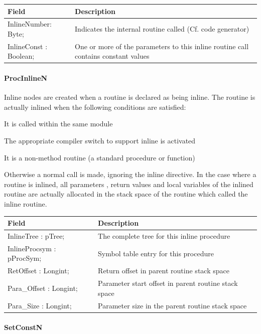 \documentclass [a4paper,12pt]{article}
\begin{document}
\begin{longtable}{|l|p{10cm}|}
\hline
Field   & Description \\
\hline
\endhead
\hline
\endfoot
\textsf{InlineNumber: Byte;}    &  Indicates the internal routine called (Cf. code generator) \\
\textsf{InlineConst : Boolean;} &
    One or more of the parameters to this inline routine call contains
    constant values
\label{tab25}
\end{longtable}

\paragraph{ProcInlineN}\mbox{}

Inline nodes are created when a routine is declared as being inline. The
routine is actually inlined when the following conditions are satisfied:

It is called within the same module

The appropriate compiler switch to support inline is activated

It is a non-method routine (a standard procedure or function)

Otherwise a normal call is made, ignoring the inline directive. In the case
where a routine is inlined, all parameters , return values and local
variables of the inlined routine are actually allocated in the stack space
of the routine which called the inline routine.

\begin{longtable}{|l|p{10cm}|}
\hline
Field   & Description \\
\hline
\endhead
\hline
\endfoot
\textsf{InlineTree : pTree;}&
    The complete tree for this inline procedure \\
\textsf{InlineProcsym : pProcSym;}&
    Symbol table entry for this procedure \\
\textsf{RetOffset : Longint;}&
    Return offset in parent routine stack space \\
\textsf{Para{\_}Offset : Longint;}&
    Parameter start offset in parent routine stack space \\
\textsf{Para{\_}Size : Longint;}&
    Parameter size in the parent routine stack space
\label{tab26}
\end{longtable}

\paragraph{SetConstN}\mbox{}
\end{document}
